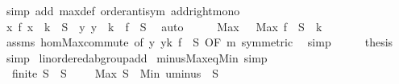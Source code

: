 \begin{isabellebody}
\ {\isacharparenleft}{\kern0pt}simp\ add{\isacharcolon}{\kern0pt}\ max{\isacharunderscore}{\kern0pt}def\ order{\isachardot}{\kern0pt}antisym\ add{\isacharunderscore}{\kern0pt}right{\isacharunderscore}{\kern0pt}mono{\isacharparenright}{\kern0pt}\isanewline
\ \ \isamarkupfalse%
\ {\isachardoublequoteopen}{\isacharparenleft}{\kern0pt}{\isasymlambda}x{\isachardot}{\kern0pt}\ f\ x\ {\isacharplus}{\kern0pt}\ k{\isacharparenright}{\kern0pt}\ {\isacharbackquote}{\kern0pt}\ S\ {\isacharequal}{\kern0pt}\ {\isacharparenleft}{\kern0pt}{\isasymlambda}y{\isachardot}{\kern0pt}\ y\ {\isacharplus}{\kern0pt}\ k{\isacharparenright}{\kern0pt}\ {\isacharbackquote}{\kern0pt}\ {\isacharparenleft}{\kern0pt}f\ {\isacharbackquote}{\kern0pt}\ S{\isacharparenright}{\kern0pt}{\isachardoublequoteclose}\ \isamarkupfalse%
\ auto\isanewline
\ \ \isamarkupfalse%
\ \isamarkupfalse%
\ {\isachardoublequoteopen}Max\ {\isasymdots}\ {\isacharequal}{\kern0pt}\ Max\ {\isacharparenleft}{\kern0pt}f\ {\isacharbackquote}{\kern0pt}\ S{\isacharparenright}{\kern0pt}\ {\isacharplus}{\kern0pt}\ k{\isachardoublequoteclose}\isanewline
\ \ \ \ \isamarkupfalse%
\ assms\ hom{\isacharunderscore}{\kern0pt}Max{\isacharunderscore}{\kern0pt}commute\ {\isacharbrackleft}{\kern0pt}of\ {\isachardoublequoteopen}{\isasymlambda}y{\isachardot}{\kern0pt}\ y{\isacharplus}{\kern0pt}k{\isachardoublequoteclose}\ {\isachardoublequoteopen}f\ {\isacharbackquote}{\kern0pt}\ S{\isachardoublequoteclose}{\isacharcomma}{\kern0pt}\ OF\ m{\isacharcomma}{\kern0pt}\ symmetric{\isacharbrackright}{\kern0pt}\ \isamarkupfalse%
\ simp\isanewline
\ \ \isamarkupfalse%
\ \isamarkupfalse%
\ {\isacharquery}{\kern0pt}thesis\ \isamarkupfalse%
\ simp\isanewline
{}\isamarkupfalse%
%
\endisatagproof
{\isafoldproof}%
%
\isadelimproof
\isanewline
%
\endisadelimproof
\isanewline
{}\isamarkupfalse%
\isanewline
\isanewline
{}\isamarkupfalse%
\ linordered{\isacharunderscore}{\kern0pt}ab{\isacharunderscore}{\kern0pt}group{\isacharunderscore}{\kern0pt}add\isanewline
{}\isanewline
\isanewline
{}\isamarkupfalse%
\ minus{\isacharunderscore}{\kern0pt}Max{\isacharunderscore}{\kern0pt}eq{\isacharunderscore}{\kern0pt}Min\ {\isacharbrackleft}{\kern0pt}simp{\isacharbrackright}{\kern0pt}{\isacharcolon}{\kern0pt}\isanewline
\ \ {\isachardoublequoteopen}finite\ S\ {\isasymLongrightarrow}\ S\ {\isasymnoteq}\ {\isacharbraceleft}{\kern0pt}{\isacharbraceright}{\kern0pt}\ {\isasymLongrightarrow}\ {\isacharminus}{\kern0pt}\ Max\ S\ {\isacharequal}{\kern0pt}\ Min\ {\isacharparenleft}{\kern0pt}uminus\ {\isacharbackquote}{\kern0pt}\ S{\isacharparenright}{\kern0pt}{\isachardoublequoteclose}\isanewline

\end{isabellebody}
